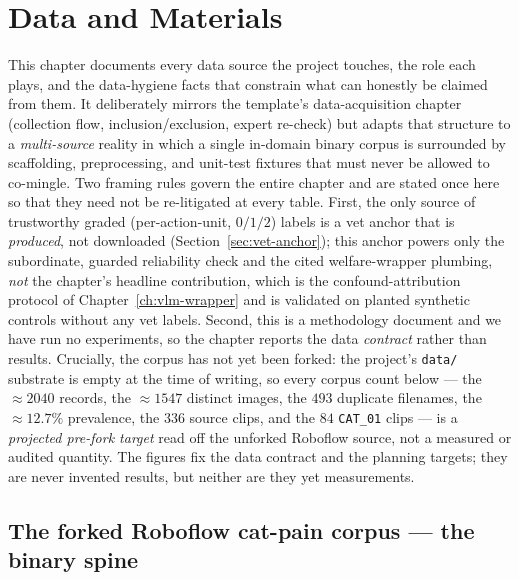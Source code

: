 
\chapter{Data and Materials}
\label{ch:data}

This chapter documents every data source the project touches, the role each
plays, and the data-hygiene facts that constrain what can honestly be claimed
from them. It deliberately mirrors the template's data-acquisition chapter
(collection flow, inclusion/exclusion, expert re-check) but adapts that
structure to a \emph{multi-source} reality in which a single in-domain binary
corpus is surrounded by scaffolding, preprocessing, and unit-test fixtures that
must never be allowed to co-mingle. Two framing rules govern the entire
chapter and are stated once here so that they need not be re-litigated at every
table. First, the only source of trustworthy graded (per-action-unit, $0/1/2$)
labels is a vet anchor that is \emph{produced}, not downloaded
(Section~\ref{sec:vet-anchor}); this anchor powers only the subordinate, guarded
reliability check and the cited welfare-wrapper plumbing, \emph{not} the
chapter's headline contribution, which is the confound-attribution protocol of
Chapter~\ref{ch:vlm-wrapper} and is validated on planted synthetic controls
without any vet labels. Second, this is a methodology document and we have run
no experiments, so the chapter reports the data \emph{contract} rather than
results. Crucially, the corpus has not yet been forked: the project's
\texttt{data/} substrate is empty at the time of writing, so every corpus count
below --- the $\approx 2040$ records, the $\approx 1547$ distinct images, the
$493$ duplicate filenames, the $\approx 12.7\%$ prevalence, the $336$ source
clips, and the $84$ \texttt{CAT\_01} clips --- is a \emph{projected pre-fork
target} read off the unforked Roboflow source, not a measured or audited
quantity. The figures fix the data contract and the planning targets; they are
never invented results, but neither are they yet measurements.

\section{The forked Roboflow cat-pain corpus --- the binary spine}
\label{sec:roboflow-spine}

